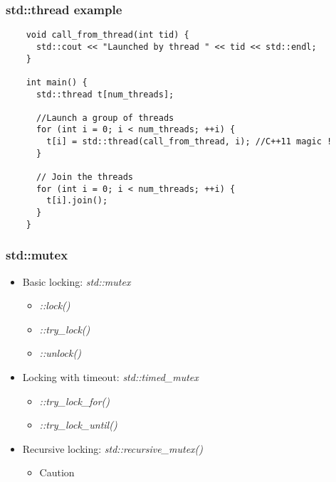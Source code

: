 \begin{frame}[fragile]
  \frametitle{std::thread example}

  \begin{verbatim}
    void call_from_thread(int tid) {
      std::cout << "Launched by thread " << tid << std::endl;
    }

    int main() {
      std::thread t[num_threads];

      //Launch a group of threads
      for (int i = 0; i < num_threads; ++i) {
        t[i] = std::thread(call_from_thread, i); //C++11 magic !
      }

      // Join the threads
      for (int i = 0; i < num_threads; ++i) {
        t[i].join();
      }
    }
  \end{verbatim}
\end{frame}


\begin{frame}
  \frametitle{std::mutex}

  \begin{itemize}
  \item Basic locking: \emph{std::mutex}
    \begin{itemize}
    \item \emph{::lock()}
    \item \emph{::try\_lock()}
    \item \emph{::unlock()}
    \end{itemize}
  \item Locking with timeout: \emph{std::timed\_mutex}
    \begin{itemize}
    \item \emph{::try\_lock\_for()}
    \item \emph{::try\_lock\_until()}
    \end{itemize}
  \item Recursive locking: \emph{std::recursive\_mutex()}
    \begin{itemize}
    \item Caution
    \end{itemize}
  \end{itemize}
\end{frame}



